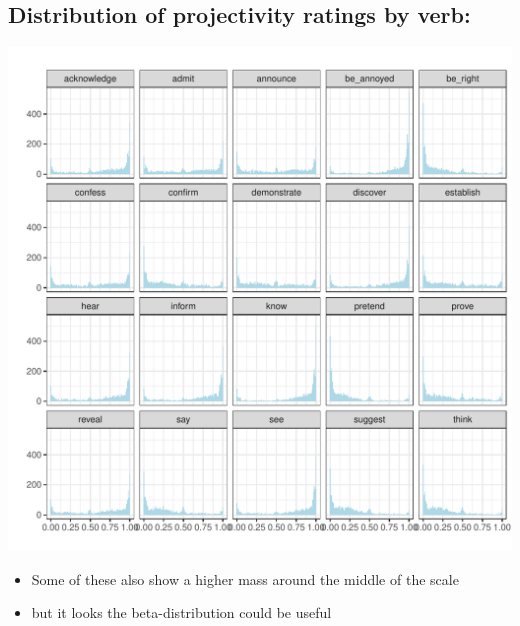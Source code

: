 \documentclass[10pt]{article}\usepackage[]{graphicx}\usepackage[dvipsnames]{xcolor}
\newenvironment{knitrout}{}{} %
\begin{document}
\subsection{Distribution of projectivity ratings by verb:}
\begin{knitrout}
\color{fgcolor}

{\centering \includegraphics[width=\linewidth]{figures/figuresproject-by-v-distr-1} 

}


\end{knitrout}

\begin{itemize}
  \item Some of these also show a higher mass around the middle of the scale
  \item but it looks the beta-distribution could be useful
\end{itemize}


\newpage
\end{document}
